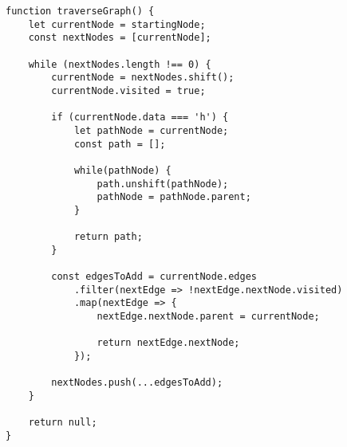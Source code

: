 \documentclass[../article.tex]{subfiles}
\begin{document}
\begin{figure*}
    \begin{ruledelement}
        \begin{lstlisting}[caption={Поиск пути при обходе взвешенного графа в ширину}, label={lst:bfsWeightedRandomPath}]
function traverseGraph() {
    let currentNode = startingNode;
    const nextNodes = [currentNode];

    while (nextNodes.length !== 0) {
        currentNode = nextNodes.shift();
        currentNode.visited = true;

        if (currentNode.data === 'h') {
            let pathNode = currentNode;
            const path = [];

            while(pathNode) {
                path.unshift(pathNode);
                pathNode = pathNode.parent;
            }

            return path;
        }

        const edgesToAdd = currentNode.edges
            .filter(nextEdge => !nextEdge.nextNode.visited)
            .map(nextEdge => {
                nextEdge.nextNode.parent = currentNode;

                return nextEdge.nextNode;
            });

        nextNodes.push(...edgesToAdd);
    }

    return null;
}
        \end{lstlisting}
    \end{ruledelement}

\end{figure*}
\end{document}
